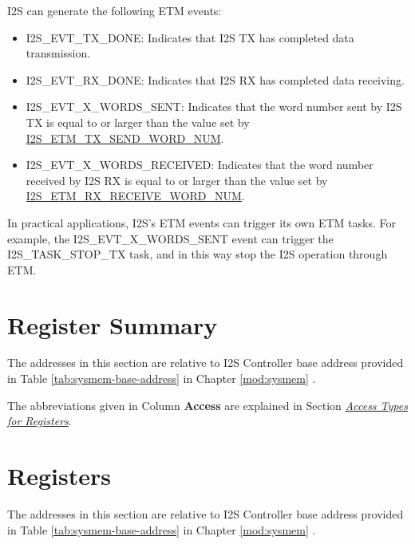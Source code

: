\documentclass[main\_\_EN.tex]{subfiles}
\begin{document}
I2S can generate the following ETM events:

\begin{itemize}
    \item \label{evt:I2SEVTTXDONE}I2S\_EVT\_TX\_DONE: Indicates that I2S TX has completed data transmission.
    \item \label{evt:I2SEVTRXDONE}I2S\_EVT\_RX\_DONE: Indicates that I2S RX has completed data receiving.
    \item \label{evt:I2SEVTXWORDSSENT}I2S\_EVT\_X\_WORDS\_SENT: Indicates that the word number sent by I2S TX is equal to or larger than the value set by \hyperref[fielddesc:I2SETMTXSENDWORDNUM]{I2S\_ETM\_TX\_SEND\_WORD\_NUM}.
    \item \label{evt:I2SEVTXWORDSRECEIVED}I2S\_EVT\_X\_WORDS\_RECEIVED: Indicates that the word number received by I2S RX is equal to or larger than the value set by \hyperref[fielddesc:I2SETMRXRECEIVEWORDNUM]{I2S\_ETM\_RX\_RECEIVE\_WORD\_NUM}.
\end{itemize}

In practical applications, I2S's ETM events can trigger its own ETM tasks. For example, the I2S\_EVT\_X\_WORDS\_SENT event can trigger the I2S\_TASK\_STOP\_TX task, and in this way stop the I2S operation through ETM.






\clearpage
\hypertarget{i2s-reg-summ}{}
\section{Register Summary}
\label{sec:i2s-reg-summ}

The addresses in this section are relative to I2S Controller base address provided in Table \ref{tab:sysmem-base-address} in Chapter \ref{mod:sysmem} \textit{}.

The abbreviations given in Column \textbf{Access} are explained in Section \hyperref[glossary-access-types]{\textit{Access Types for Registers}}.






\clearpage
\section{Registers}

The addresses in this section are relative to I2S Controller base address provided in Table \ref{tab:sysmem-base-address} in Chapter \ref{mod:sysmem} \textit{}.


\end{document}
